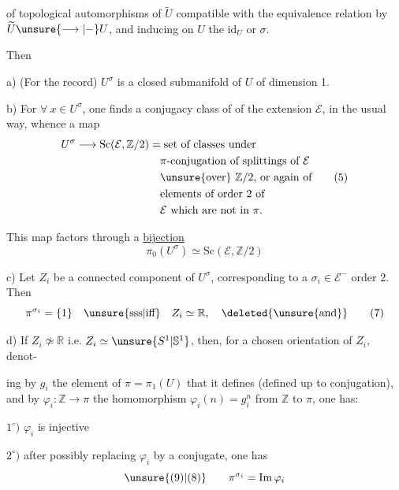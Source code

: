 
of topological automorphisms of $\widetilde U$ compatible with the
equivalence relation  by $\widetilde U\unsure{\longrightarrow|-}U$, and
inducing on $U$ the  $\mathrm{id}_U$ or $\sigma$.

 Then

a) (For the record) $U^\sigma$ is a closed submanifold
of $U$ of dimension 1.

b) For $\forall\ x\in U^\sigma$, one finds a
\inserted{$\pi$-}conjugacy class of  of the extension
$\mathcal E$, in the usual way, whence a
map
\[
 \begin{aligned}
 U^\sigma\longrightarrow\mathrm{Sc}(\mathcal E,\mathbb Z/2)
 &=\text{set of classes under}\\
 &\quad\text{$\pi$-conjugation of splittings of $\mathcal E$}\\
 &\quad\text{\unsure{over} $\mathbb Z/2$, or again of}\\
 &\quad\text{elements of order $2$ of}\\
 &\quad\text{$\mathcal E$ which are not in $\pi$.}
 \end{aligned}
 \tag{5}
\]

This map factors through a
\uline{bijection}
\[
 \pi_0(U^\sigma)\simeq\mathrm{Sc}(\mathcal E,\mathbb Z/2)
 \tag{6}
\]

c) Let $Z_i$ be a connected component of $U^\sigma$,
corresponding to a  $\sigma_i\in\mathcal E^-$ 
order $2$. Then 
\[
 \pi^{\sigma_i}=\{1\}\quad\text{\unsure{sss|iff}}\quad Z_i\simeq\mathbb R,
 \quad\deleted{\unsure{\text{and}}}
 \tag{7}
\]

d) If $Z_i\not\simeq\mathbb R$ i.e.  $Z_i\simeq\unsure{S^1|\mathbb S^1}$, then,
for a chosen orientation of $Z_i$, denot-

ing by $g_i$ the element of $\pi=\pi_1(U)$
that it defines (defined up to conjugation), and
by $\varphi_i:\mathbb Z\longrightarrow\pi$ the homomorphism $\varphi_i(n)=g_i^n$ from
$\mathbb Z$ to $\pi$, one has:

$1^\circ)$ $\varphi_i$ is injective

$2^\circ)$ after possibly replacing $\varphi_i$ by a conjugate,
one has
\[
\unsure{(9)|(8)}\qquad \pi^{\sigma_i}=\operatorname{Im}\varphi_i
\]

